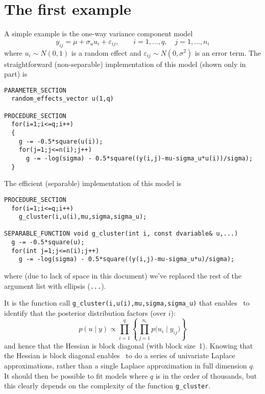 \documentclass{admbmanual}
\begin{document}
\section{The first example}

A simple example is the one-way variance component model
\[
y_{ij}=\mu +\sigma_u u_i+\varepsilon_{ij},
\qquad i=1,\ldots,q,\quad j=1,\ldots,n_i
\]
where $u_i\sim N(0,1)$ is a random effect and $\varepsilon_{ij}\sim
N(0,\sigma^2)$ is an error term. The straightforward (non-separable)
implementation of this model (shown only in part) is
\begin{lstlisting}
PARAMETER_SECTION
  random_effects_vector u(1,q)

PROCEDURE_SECTION
  for(i=1;i<=q;i++)
  {
    g -= -0.5*square(u(i));
    for(j=1;j<=n(i);j++)
      g -= -log(sigma) - 0.5*square((y(i,j)-mu-sigma_u*u(i))/sigma);
  }
\end{lstlisting}
The efficient (separable) implementation of this model is
\begin{lstlisting}
PROCEDURE_SECTION
  for(i=1;i<=q;i++)
    g_cluster(i,u(i),mu,sigma,sigma_u);

SEPARABLE_FUNCTION void g_cluster(int i, const dvariable& u,...)
  g -= -0.5*square(u);
  for(int j=1;j<=n(i);j++)
    g -= -log(sigma) - 0.5*square((y(i,j)-mu-sigma_u*u)/sigma);
\end{lstlisting}
where (due to lack of space in this document) we've replaced the rest of the
argument list with ellipsis (\texttt{...}).

It is the function call \texttt{g\_cluster(i,u(i),mu,sigma,sigma\_u)} that
enables \scAR\ to identify that the posterior distribution
factors (over $i$):
\[
p(u \mid y) \propto \prod_{i=1}^q
\left\{\prod_{j=1}^{n_i}p \bigl(u_i \mid y_{ij}\bigr)\right\}
\]
and hence that the Hessian is block diagonal (with block size~1). Knowing that
the Hessian is block diagonal enables \scAR\ to do a series of univariate
Laplace approximations, rather than a single Laplace approximation in full
dimension $q$. It should then be possible to fit models where $q$ is in the
order of thousands, but this clearly depends on the complexity of the function
\texttt{g\_cluster}.
\end{document}
